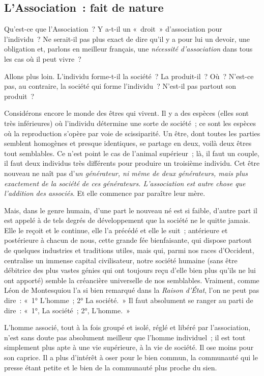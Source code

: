 \documentclass[french,twoside]{book} %
\newcommand{\astermono}{\medskip\centerline{\color{rubric}\large\selectfont{\syms ✻}}\medskip\par}%
\begin{document}
\astermono

\subsection[L’Association : fait de nature]{L’Association : fait de nature}
\noindent Qu’est-ce que l’Association ? Y a-t-il un « droit » d’association pour l’individu ? Ne serait-il pas plus exact de dire qu’il y a pour lui un devoir, une obligation et, parlons en meilleur français, une \emph{nécessité d’association} dans tous les cas où il peut vivre ?\par
Allons plus loin. L’individu forme-t-il la société ? La produit-il ? Où ? N’est-ce pas, au contraire, la société qui forme l’individu ? N’est-il pas partout son produit ?\par
Considérons encore le monde des êtres qui vivent. Il y a des espèces (elles sont très inférieures) où l’individu détermine une sorte de société ; ce sont les espèces où la reproduction s’opère par voie de scissiparité. Un être, dont toutes les parties semblent homogènes et presque identiques, se partage en deux, voilà deux êtres tout semblables. Ce n’est point le cas de l’animal supérieur ; là, il faut un couple, il faut deux individus très différents pour produire un troisième individu. Cet être nouveau ne naît pas d’\emph{un générateur, ni même de deux générateurs, mais plus exactement de la société de ces générateurs. L’association est autre chose que l’addition des associés}. Et elle commence par paraître leur mère.\par
Mais, dans le genre humain, d’une part le nouveau né est si faible, d’autre part il est appelé à de tels degrés de développement que la société ne le quitte jamais. Elle le reçoit et le continue, elle l’a précédé et elle le suit ; antérieure et postérieure à chacun de nous, cette grande fée bienfaisante, qui dispose partout de quelques industries et traditions utiles, mais qui, parmi nos races d’Occident, centralise un immense capital civilisateur, notre société humaine (sans être débitrice des plus vastes génies qui ont toujours reçu d’elle bien plus qu’ils ne lui ont apporté) semble la créancière universelle de nos semblables. Vraiment, comme Léon de Montesquiou l’a si bien remarqué dans la \emph{Raison d’État}, l’on ne peut pas dire : « 1° L’homme ; 2° La société. » Il faut absolument se ranger au parti de dire : « 1°, La société ; 2°, L’homme. »\par
L’homme associé, tout à la fois groupé et isolé, réglé et libéré par l’association, n’est sans doute pas absolument meilleur que l’homme individuel ; il est tout simplement plus apte à une vie supérieure, à la vie de société. Il ose moins pour son caprice. Il a plus d’intérêt à oser pour le bien commun, la communauté qui le presse étant petite et le bien de la communauté plus proche du sien.\par
\end{document}
